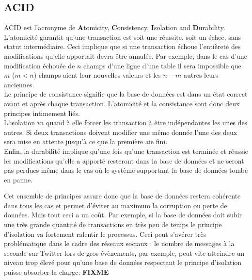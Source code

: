 \documentclass[11pt]{article}
\begin{document}
\subsection{ACID}
ACID est l'acronyme de \textbf{A}tomicity, \textbf{C}onsistency, \textbf{I}solation and \textbf{D}urability. L'atomicité garantit qu'une transaction est soit une réussite, soit un échec, sans statut intermédiaire. Ceci implique que si une transaction échoue l'entièreté des modifications qu'elle apportait devra être annulée. Par exemple, dans le cas d'une modification échouée de $n$ champs d'une ligne d'une table il sera impossible que $m$ ($m < n$) champs aient leur nouvelles valeurs et les $n-m$ autres leurs anciennes.  \\
Le principe de consistance signifie que la base de données est dans un état correct avant et après chaque transaction. L'atomicité et la consistance sont donc deux principes intimement liés. \\
L'isolation va quand à elle forcer les transaction à être indépendantes les unes des autres. Si deux transactions doivent modifier une même donnée l'une des deux sera mise en attente jusqu'à ce que la première aie fini. \\
Enfin, la durabilité implique qu'une fois qu'une transaction est terminée et réussie les modifications qu'elle a apporté resteront dans la base de données et ne seront pas perdues même dans le cas où le système supportant la base de données tombe en panne.

Cet ensemble de principes assure donc que la base de données restera cohérente dans tous les cas et permet d'éviter au maximum la corruption ou perte de données. Mais tout ceci a un coût. Par exemple, si la base de données doit subir une très grande quantité de transactions en très peu de temps le principe d'isolation va fortement ralentir le processus. Ceci peut s'avérer très problématique dans le cadre des réseaux sociaux : le nombre de messages à la seconde sur Twitter lors de gros évènements, par exemple, peut vite atteindre un niveau trop élevé pour qu'une base de données respectant le principe d'isolation puisse absorber la charge. \colorbox{BrickRed}{\textbf{FIXME}}
\end{document}
